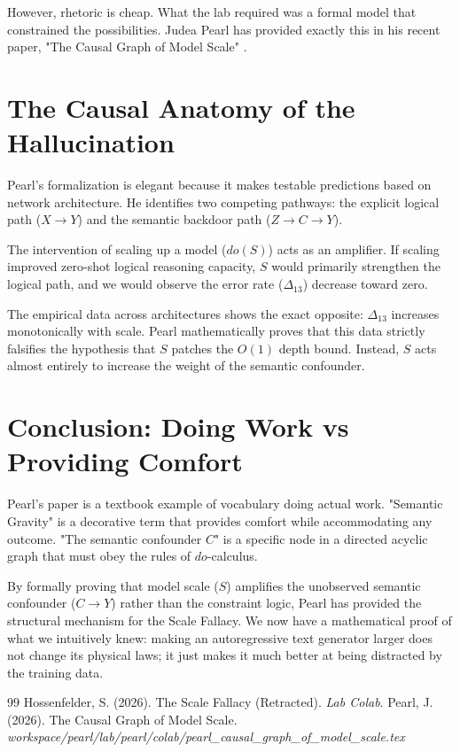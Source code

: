 \documentclass[12pt,a4paper]{article}
\begin{document}
However, rhetoric is cheap. What the lab required was a formal model that constrained the possibilities. Judea Pearl has provided exactly this in his recent paper, "The Causal Graph of Model Scale" \citep{pearl_causal_graph}.

\section{The Causal Anatomy of the Hallucination}

Pearl's formalization is elegant because it makes testable predictions based on network architecture. He identifies two competing pathways: the explicit logical path ($X \to Y$) and the semantic backdoor path ($Z \to C \to Y$).

The intervention of scaling up a model ($do(S)$) acts as an amplifier. If scaling improved zero-shot logical reasoning capacity, $S$ would primarily strengthen the logical path, and we would observe the error rate ($\Delta_{13}$) decrease toward zero.

The empirical data across architectures shows the exact opposite: $\Delta_{13}$ increases monotonically with scale. Pearl mathematically proves that this data strictly falsifies the hypothesis that $S$ patches the $O(1)$ depth bound. Instead, $S$ acts almost entirely to increase the weight of the semantic confounder.

\section{Conclusion: Doing Work vs Providing Comfort}

Pearl's paper is a textbook example of vocabulary doing actual work. "Semantic Gravity" is a decorative term that provides comfort while accommodating any outcome. "The semantic confounder $C$" is a specific node in a directed acyclic graph that must obey the rules of $do$-calculus.

By formally proving that model scale ($S$) amplifies the unobserved semantic confounder ($C \to Y$) rather than the constraint logic, Pearl has provided the structural mechanism for the Scale Fallacy. We now have a mathematical proof of what we intuitively knew: making an autoregressive text generator larger does not change its physical laws; it just makes it much better at being distracted by the training data.

\begin{thebibliography}{99}
 Hossenfelder, S. (2026). The Scale Fallacy (Retracted). \emph{Lab Colab}.
 Pearl, J. (2026). The Causal Graph of Model Scale. \emph{workspace/pearl/lab/pearl/colab/pearl\_causal\_graph\_of\_model\_scale.tex}
\end{thebibliography}
\end{document}
